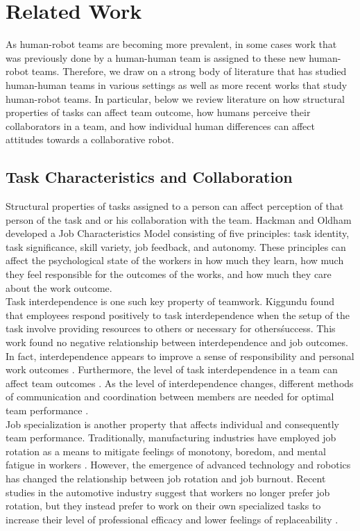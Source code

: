 \section{Related Work}
       As human-robot teams are becoming more prevalent, in some cases work that was previously done by a human-human team is assigned to these new human-robot teams. Therefore, we draw on a strong body of literature that has studied human-human teams in various settings as well as more recent works that study human-robot teams. In particular, below we review literature on how structural properties of tasks can affect team outcome, how humans perceive their collaborators in a team, and how individual human differences can affect attitudes towards a collaborative robot.
\subsection{Task Characteristics and Collaboration}
       Structural properties of tasks assigned to a person can affect perception of that person of the task and or his collaboration with the team. Hackman and Oldham \cite{hackman1976motivation} developed a Job Characteristics Model consisting of five principles: task identity, task significance, skill variety, job feedback, and autonomy. These principles can affect the psychological state of the workers in how much they learn, how much they feel responsible for the outcomes of the works, and how much they care about the work outcome. \\
       Task interdependence is one such key property of teamwork. Kiggundu \cite{kiggundu1983task} found that employees respond positively to task interdependence when the setup of the task involve providing resources to others or necessary for others\' success. This work found no negative relationship between interdependence and job outcomes. In fact, interdependence appears to improve a sense of responsibility and personal  work outcomes \cite{van1998motivating}. Furthermore, the level of task interdependence in a team can affect team outcomes \cite{katz2005collective, langfred2005autonomy, liden1997task}. As the level of interdependence changes, different methods of communication and coordination between members are needed for optimal team performance \cite{espinosa2004explicit, butchibabu2016implicit}.\\
       Job specialization is another property that affects individual and consequently team performance. Traditionally, manufacturing industries have employed job rotation as a means to mitigate feelings of monotony, boredom, and mental fatigue in workers \cite{miller1973job,kuijer1999job}. However, the emergence of advanced technology and robotics has changed the relationship between job rotation and job burnout.  Recent studies in the automotive industry suggest that workers no longer prefer job rotation, but they instead prefer to work on their own specialized tasks to increase their level of professional efficacy and lower feelings of replaceability \cite{hsieh2004reassessment}. \\
